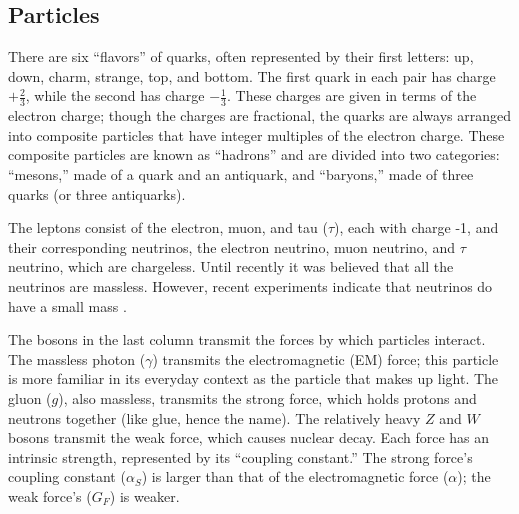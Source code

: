 \subsection{Particles}
\label{theory:particles}
There are six ``flavors'' of quarks, 
often represented by their first letters: 
up, down, charm, strange, top, and bottom.  
The first quark in each pair has charge $+\frac{2}{3}$, 
while the second has charge $-\frac{1}{3}$.  
These charges are given in terms of the electron charge; 
though the charges are fractional, 
the quarks are always arranged into composite 
particles that have integer multiples of the electron charge.  
These composite particles are known as ``hadrons'' 
and are divided into two categories: 
``mesons,'' made of a quark and an antiquark, 
and ``baryons,'' made of three quarks 
(or three antiquarks).  

The leptons consist of the electron, muon, and tau ($\tau$), 
each with charge -1, 
and their corresponding neutrinos, 
the electron neutrino, muon neutrino, and $\tau$ neutrino, 
which are chargeless.  
Until recently it was believed that all the neutrinos are massless.  
However, recent experiments indicate 
that neutrinos do have a small mass 
\cite{neutrinoMixing}.  

The bosons in the last column transmit the forces 
by which particles interact.  
The massless photon ($\gamma$) transmits the 
electromagnetic (EM) force; 
this particle is more familiar in its 
everyday context as the particle that makes up light.  
The gluon ($g$), also massless, transmits the strong force, 
which holds protons and neutrons together     %
(like glue, hence the name).  
The relatively heavy $Z$ and $W$ bosons 
transmit the weak force, 
which causes nuclear decay.  
Each force has an intrinsic strength, %
represented by its ``coupling constant.''  
The strong force's coupling constant ($\alpha_S$)
is larger than that 
of the electromagnetic force ($\alpha$); 
the weak force's ($G_F$) is weaker.  

